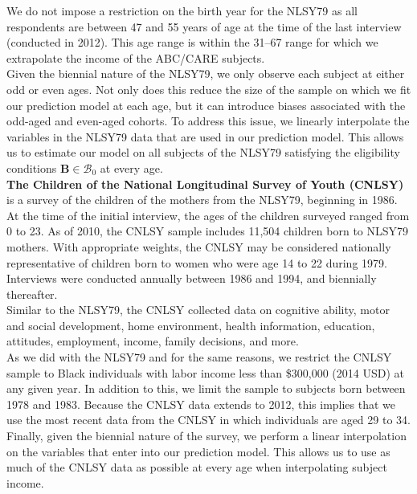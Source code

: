 \noindent We do not impose a restriction on the birth year for the NLSY79 as all respondents are between 47 and 55 years of age at the time of the last interview (conducted in 2012). This age range is within the 31--67 range for which we extrapolate the income of the ABC/CARE subjects.\\

\noindent Given the biennial nature of the NLSY79, we only observe each subject at either odd or even ages. Not only does this reduce the size of the sample on which we fit our prediction model at each age, but it can introduce biases associated with the odd-aged and even-aged cohorts. To address this issue, we linearly interpolate the variables in the NLSY79 data that are used in our prediction model. This allows us to estimate our model on all subjects of the NLSY79 satisfying the eligibility conditions $\bm{B}\in\mathcal{B}_0$ at every age.\\

\noindent\textbf{The Children of the National Longitudinal Survey of Youth (CNLSY)} is a survey of the children of the mothers from the NLSY79, beginning in 1986. At the time of the initial interview, the ages of the children surveyed ranged from 0 to 23. As of 2010, the CNLSY sample includes 11,504 children born to NLSY79 mothers. With appropriate weights, the CNLSY may be considered nationally representative of children born to women who were age 14 to 22 during 1979. Interviews were conducted annually between 1986 and 1994, and biennially thereafter.\\

\noindent Similar to the NLSY79, the CNLSY collected data on cognitive ability, motor and social development, home environment, health information, education, attitudes, employment, income, family decisions, and more.\\

\noindent As we did with the NLSY79 and for the same reasons, we restrict the CNLSY sample to Black individuals with labor income less than \$300,000 (2014 USD) at any given year. In addition to this, we limit the sample to subjects born between 1978 and 1983. Because the CNLSY data extends to 2012, this implies that we use the most recent data from the CNLSY in which individuals are aged 29 to 34. Finally, given the biennial nature of the survey, we perform a linear interpolation on the variables that enter into our prediction model. This allows us to use as much of the CNLSY data as possible at every age when interpolating subject income.\\

